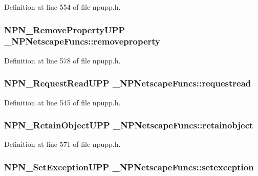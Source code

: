Definition at line 554 of file npupp.h.

\hypertarget{struct___n_p_netscape_funcs_a068280bbc940b066b586e61de6ee2c6a}{
\subsubsection[{removeproperty}]{\setlength{\rightskip}{0pt plus 5cm}NPN\_\-RemovePropertyUPP {\bf \_\-NPNetscapeFuncs::removeproperty}}}
\label{struct___n_p_netscape_funcs_a068280bbc940b066b586e61de6ee2c6a}


Definition at line 578 of file npupp.h.

\hypertarget{struct___n_p_netscape_funcs_a8e7709c440b46b66a5f5e47006b3a9b1}{
\subsubsection[{requestread}]{\setlength{\rightskip}{0pt plus 5cm}NPN\_\-RequestReadUPP {\bf \_\-NPNetscapeFuncs::requestread}}}
\label{struct___n_p_netscape_funcs_a8e7709c440b46b66a5f5e47006b3a9b1}


Definition at line 545 of file npupp.h.

\hypertarget{struct___n_p_netscape_funcs_a8bfc6725884dc636d136276a5514f972}{
\subsubsection[{retainobject}]{\setlength{\rightskip}{0pt plus 5cm}NPN\_\-RetainObjectUPP {\bf \_\-NPNetscapeFuncs::retainobject}}}
\label{struct___n_p_netscape_funcs_a8bfc6725884dc636d136276a5514f972}


Definition at line 571 of file npupp.h.

\hypertarget{struct___n_p_netscape_funcs_afb9d942fd173a2951286a811be4eab5d}{
\subsubsection[{setexception}]{\setlength{\rightskip}{0pt plus 5cm}NPN\_\-SetExceptionUPP {\bf \_\-NPNetscapeFuncs::setexception}}}
\label{struct___n_p_netscape_funcs_afb9d942fd173a2951286a811be4eab5d}


